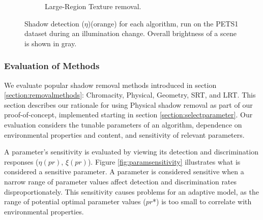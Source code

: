 \begin{figure}
\begin{subfigure}{.32\linewidth}
  \caption{Large-Region Texture removal.}
\end{subfigure}
\caption{Shadow detection ($\eta$)(orange) for each algorithm, run on the PETS1 dataset during an illumination change. Overall brightness of a scene is shown in gray.}
\label{fig:selectinganalgorithm}
\end{figure}

\FloatBarrier
\subsubsection{Evaluation of Methods}

We evaluate popular shadow removal methods introduced in section \ref{section:removalmethods}: Chromacity, Physical, Geometry, SRT, and LRT. This section describes our rationale for using Physical shadow removal as part of our proof-of-concept, implemented starting in section \ref{section:selectparameter}. Our evaluation considers the tunable parameters of an algorithm, dependence on environmental properties and content, and sensitivity of relevant parameters.

A parameter's sensitivity is evaluated by viewing its detection and discrimination responses ($\eta(pr)$, $\xi(pr)$). Figure \ref{fig:paramsensitivity} illustrates what is considered a sensitive parameter. A parameter is considered sensitive when a narrow range of parameter values affect detection and discrimination rates disproportionately. This sensitivity causes problems for an adaptive model, as the range of potential optimal parameter values ($pr$*) is too small to correlate with environmental properties. 

